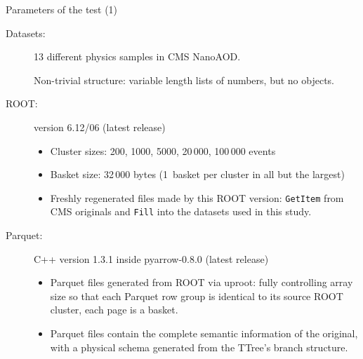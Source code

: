 \documentclass[aspectratio=169]{beamer}
\begin{document}
\begin{frame}{Parameters of the test (1)}
\vspace{0.35 cm}
\begin{description}
\item[Datasets:] 13 different physics samples in CMS NanoAOD.

\vspace{0.1 cm}
Non-trivial structure: variable length lists of numbers, but no objects.

\vspace{0.2 cm}
\item[ROOT:] version 6.12/06 (latest release)

\begin{itemize}
\item Cluster sizes: 200, 1000, 5000, 20\,000, 100\,000 events
\item Basket size: 32\,000 bytes (1~basket per cluster in all but the largest)
\item Freshly regenerated files made by this ROOT version: {\tt\small GetItem} from CMS originals and {\tt\small Fill} into the datasets used in this study.
\end{itemize}

\item[Parquet:] C++ version 1.3.1 inside pyarrow-0.8.0 (latest release)

\begin{itemize}
\item Parquet files generated from ROOT via uproot: fully controlling array size so that each Parquet row group is identical to its source ROOT cluster, each page is a basket.
\item Parquet files contain the complete semantic information of the original, with a physical schema generated from the TTree's branch structure.
\end{itemize}
\end{description}
\end{frame}
\end{document}
